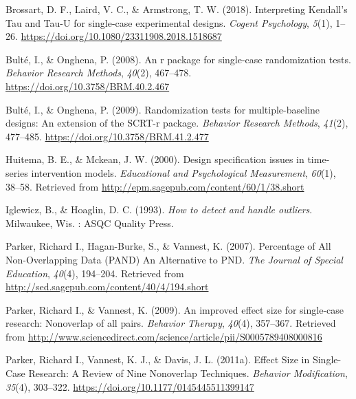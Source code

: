 \documentclass[
  letterpaper,
  DIV=11,
  numbers=noendperiod]{scrreprt}
\newlength{\cslhangindent}
\newlength{\cslentryspacingunit} %
\newenvironment{CSLReferences}[2] %
 {%
  \setlength{\parindent}{0pt}
  \ifodd #1
  \let\oldpar\par
  \def\par{\hangindent=\cslhangindent\oldpar}
  \fi
  \setlength{\parskip}{#2\cslentryspacingunit}
 }%
 {}
\begin{document}
\hypertarget{refs}{}
\begin{CSLReferences}{1}{0}
\leavevmode{}%
Brossart, D. F., Laird, V. C., \& Armstrong, T. W. (2018). Interpreting
Kendall{'}s Tau and Tau-U for single-case experimental designs.
\emph{Cogent Psychology}, \emph{5}(1), 1--26.
\url{https://doi.org/10.1080/23311908.2018.1518687}

\leavevmode{}%
Bulté, I., \& Onghena, P. (2008). An r package for single-case
randomization tests. \emph{Behavior Research Methods}, \emph{40}(2),
467--478. \url{https://doi.org/10.3758/BRM.40.2.467}

\leavevmode{}%
Bulté, I., \& Onghena, P. (2009). Randomization tests for
multiple-baseline designs: An extension of the SCRT-r package.
\emph{Behavior Research Methods}, \emph{41}(2), 477--485.
\url{https://doi.org/10.3758/BRM.41.2.477}

\leavevmode{}%
Huitema, B. E., \& Mckean, J. W. (2000). Design specification issues in
time-series intervention models. \emph{Educational and Psychological
Measurement}, \emph{60}(1), 38--58. Retrieved from
\url{http://epm.sagepub.com/content/60/1/38.short}

\leavevmode{}%
Iglewicz, B., \& Hoaglin, D. C. (1993). \emph{How to detect and handle
outliers}. Milwaukee, Wis. : ASQC Quality Press.

\leavevmode{}%
Parker, Richard I., Hagan-Burke, S., \& Vannest, K. (2007). Percentage
of {All} {Non}-{Overlapping} {Data} ({PAND}) {An} {Alternative} to
{PND}. \emph{The Journal of Special Education}, \emph{40}(4), 194--204.
Retrieved from \url{http://sed.sagepub.com/content/40/4/194.short}

\leavevmode{}%
Parker, Richard I., \& Vannest, K. (2009). An improved effect size for
single-case research: {Nonoverlap} of all pairs. \emph{Behavior
Therapy}, \emph{40}(4), 357--367. Retrieved from
\url{http://www.sciencedirect.com/science/article/pii/S0005789408000816}

\leavevmode{}%
Parker, Richard I., Vannest, K. J., \& Davis, J. L. (2011a). Effect
{Size} in {Single}-{Case} {Research}: {A} {Review} of {Nine}
{Nonoverlap} {Techniques}. \emph{Behavior Modification}, \emph{35}(4),
303--322. \url{https://doi.org/10.1177/0145445511399147}


\end{CSLReferences}
\end{document}
